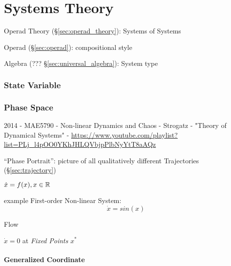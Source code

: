 \part{Systems Theory}\label{sec:systems_theory}


Operad Theory (\S\ref{sec:operad_theory}): Systems of Systems

Operad (\S\ref{sec:operad}): compositional style

Algebra (??? \S\ref{sec:universal_algebra}): System type



\section{State Variable}\label{sec:state_variable}

\section{Phase Space}\label{sec:phase_space}

2014 - MAE5790 - Non-linear Dynamics and Chaos - Strogatz - "Theory of
Dynamical Systems" -
\url{https://www.youtube.com/playlist?list=PLj_l4pOO0YKhJHLQVbjpPlbNyYtT8aAQz}

``Phase Portrait'': picture of all qualitatively different Trajectories
(\S\ref{sec:trajectory})

$\dot{x} = f(x), x \in \mathbb{R}$

example First-order Non-linear System:
\[
  \dot{x} = sin(x)
\]

Flow

$\dot{x} = 0$ at \emph{Fixed Points} $x^*$



\subsection{Generalized Coordinate}\label{sec:generalized_coordinate}

